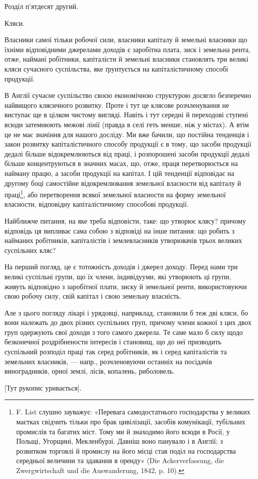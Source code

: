 Розділ п’ятдесят другий.

Кляси.

Власники самої тільки робочої сили, власники капіталу й земельні власники
що їхніми відповідними джерелами доходів є заробітна плата, зиск і земельна рента,
отже, наймані робітники, капіталісти й земельні власники становлять три великі
кляси сучасного суспільства, яке ґрунтується на капіталістичному способі
продукції.

В Англії сучасне суспільство своєю економічною структурою досягло безперечно
найвищого клясичного розвитку. Проте і тут це клясове розчленування не
виступає ще в цілком чистому вигляді. Навіть і тут середні й переходові ступені
всюди затемнюють межові лінії (правда в селі геть менше, ніж у містах).
А втім це не має значіння для нашого досліду. Ми вже бачили, що постійна
тенденція і закон розвитку капіталістичного способу продукції є в тому, що
засоби продукції дедалі більше відокремлюються від праці, і розпорошені засоби
продукції дедалі більше концентруються в значних масах, що, отже, праця
перетворюється на найману працю, а засоби продукції на капітал. І цій тенденції
відповідає на другому боці самостійне відокремлювання земельної власности
від капіталу й праці\footnote{
F. List слушно зауважує: «Перевага самодостатнього господарства у великих маєтках
свідчить тільки про брак цивілізації, засобів комунікації, тубільних промислів та багатих міст. Тому
ми й знаходимо його всюди в Росії, у Польщі, Угорщині, Мекленбурзі. Давніш воно панувало і в Англії;
з розвитком торговлі й промислу на його місці став поділ на господарства середньої величини та
здавання в оренду» (Die Ackerverfassung, die Zwergwirtschaft und die Auswanderung, 1842, p. 10).
}, або перетворення всякої земельної власности на форму
земельної власности, відповідну капіталістичному способові продукції.

Найближче питання, на яке треба відповісти, таке: що утворює клясу?
причому відповідь ця випливає сама собою з відповіді на інше питання: що
робить з найманих робітників, капіталістів і землевласників утворювачів трьох
великих суспільних кляс?

На перший погляд, це є тотожність доходів і джерел доходу. Перед нами
три великі суспільні групи, що їх члени, індивідууми, які утворюють ці групи,
живуть відповідно з заробітної плати, зиску й земельної ренти, використовуючи
свою робочу силу, свій капітал і свою земельну власність.

Але з цього погляду лікарі і урядовці, наприклад, становили б теж дві
кляси, бо вони належать до двох різних суспільних груп, причому члени кожної
з цих двох груп одержують свої доходи з того самого джерела. Те саме мало б
силу щодо безконечної роздрібнености інтересів і становищ, що до неї призводить
суспільний розподіл праці так серед робітників, як і серед капіталістів та
земельних власників, — напр., розчленовуючи останніх на посідачів виноградників,
орної землі, лісів, копалень, риболовель.

[Тут рукопис уривається].